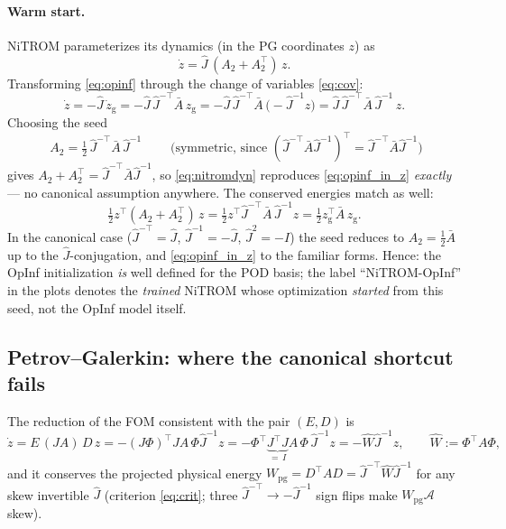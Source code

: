 \paragraph{Warm start.}
NiTROM parameterizes its dynamics (in the PG coordinates $z$) as
\begin{equation}
  \dot z = \hat{J}\,(A_2 + A_2^{\top})\, z .
  \label{eq:nitromdyn}
\end{equation}
Transforming \eqref{eq:opinf} through the change of variables \eqref{eq:cov}:
\begin{equation}
  \dot z = -\hat{J}\,\dot z_{\mathrm{g}}
         = -\hat{J}\,\hat{J}^{-\top} \bar{A}\, z_{\mathrm{g}}
         = -\hat{J}\,\hat{J}^{-\top} \bar{A}\,\bigl(-\hat{J}^{-1} z\bigr)
         = \hat{J}\,\hat{J}^{-\top} \bar{A}\, \hat{J}^{-1}\, z .
  \label{eq:opinf_in_z}
\end{equation}
Choosing the seed
\begin{equation}
  \boxed{\;A_2 = \tfrac12\, \hat{J}^{-\top} \bar{A}\, \hat{J}^{-1}\;}
  \qquad\text{(symmetric, since }
  (\hat{J}^{-\top}\bar{A}\hat{J}^{-1})^{\top}
   = \hat{J}^{-\top}\bar{A}\hat{J}^{-1}\text{)}
\end{equation}
gives $A_2 + A_2^{\top} = \hat{J}^{-\top}\bar{A}\hat{J}^{-1}$, so
\eqref{eq:nitromdyn} reproduces \eqref{eq:opinf_in_z} \emph{exactly} --- no
canonical assumption anywhere. The conserved energies match as well:
\begin{equation}
  \tfrac12 z^{\top} (A_2 + A_2^{\top})\, z
  = \tfrac12 z^{\top} \hat{J}^{-\top}\bar{A}\,\hat{J}^{-1} z
  = \tfrac12 z_{\mathrm{g}}^{\top} \bar{A}\, z_{\mathrm{g}} .
\end{equation}
In the canonical case ($\hat{J}^{-\top} = \hat{J}$, $\hat{J}^{-1} = -\hat{J}$,
$\hat J^2 = -I$) the seed reduces to $A_2 = \tfrac12 \bar A$ up to the
$\hat J$-conjugation, and \eqref{eq:opinf_in_z} to the familiar forms. Hence:
the OpInf initialization \emph{is} well defined for the POD basis; the label
``NiTROM-OpInf'' in the plots denotes the \emph{trained} NiTROM whose
optimization \emph{started} from this seed, not the OpInf model itself.

\subsection{Petrov--Galerkin: where the canonical shortcut fails}

The reduction of the FOM consistent with the pair $(E, D)$ is
\begin{equation}
  \dot z = E\,(J A)\, D\, z
  = -(J\Phi)^{\top} J A\, \Phi \hat{J}^{-1} z
  = -\Phi^{\top} \underbrace{J^{\top} J}_{=\,I} A\, \Phi\, \hat{J}^{-1} z
  = -\hat{W} \hat{J}^{-1} z ,
  \qquad \hat{W} := \Phi^{\top} A \Phi ,
  \label{eq:pg_consistent}
\end{equation}
and it conserves the projected physical energy
$W_{\mathrm{pg}} = D^{\top} A D = \hat{J}^{-\top}\hat{W}\hat{J}^{-1}$
for any skew invertible $\hat J$ (criterion \eqref{eq:crit}; three
$\hat{J}^{-\top}\!\to -\hat{J}^{-1}$ sign flips make
$W_{\mathrm{pg}}\mathcal{A}$ skew).

